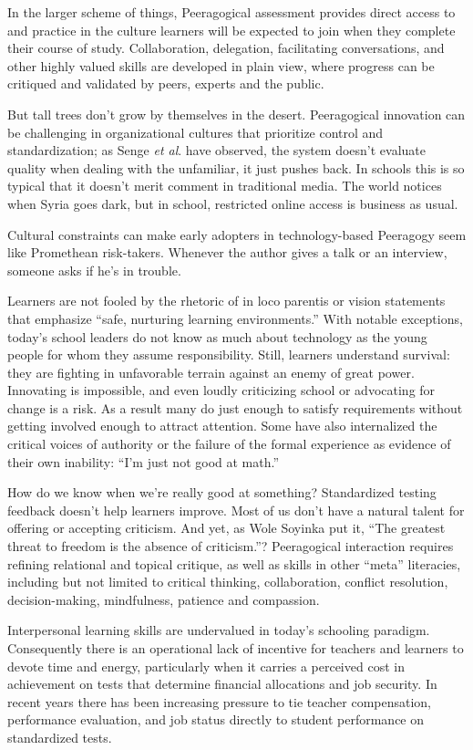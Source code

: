 In the larger scheme of things, Peeragogical assessment provides direct
access to and practice in the culture learners will be expected to join
when they complete their course of study. Collaboration, delegation,
facilitating conversations, and other highly valued skills are developed
in plain view, where progress can be critiqued and validated by peers,
experts and the public.

But tall trees don't grow by themselves in the desert. Peeragogical
innovation can be challenging in organizational cultures that prioritize
control and standardization; as Senge \emph{et al}. have observed, the
system doesn't evaluate quality when dealing with the unfamiliar, it
just pushes back. In schools this is so typical that it doesn't merit
comment in traditional media. The world notices when Syria goes dark,
but in school, restricted online access is business as usual.

Cultural constraints can make early adopters in technology-based
Peeragogy seem like Promethean risk-takers. Whenever the author gives a
talk or an interview, someone asks if he's in trouble.

Learners are not fooled by the rhetoric of in loco parentis or vision
statements that emphasize ``safe, nurturing learning environments.''
With notable exceptions, today's school leaders do not know as much
about technology as the young people for whom they assume
responsibility. Still, learners understand survival: they are fighting
in unfavorable terrain against an enemy of great power. Innovating is
impossible, and even loudly criticizing school or advocating for change
is a risk. As a result many do just enough to satisfy requirements
without getting involved enough to attract attention. Some have also
internalized the critical voices of authority or the failure of the
formal experience as evidence of their own inability: ``I'm just not
good at math.''

How do we know when we're really good at something? Standardized testing
feedback doesn't help learners improve. Most of us don't have a natural
talent for offering or accepting criticism. And yet, as Wole Soyinka put
it, ``The greatest threat to freedom is the absence of criticism.''?
Peeragogical interaction requires refining relational and topical
critique, as well as skills in other ``meta'' literacies, including but
not limited to critical thinking, collaboration, conflict resolution,
decision-making, mindfulness, patience and compassion.

Interpersonal learning skills are undervalued in today's schooling
paradigm. Consequently there is an operational lack of incentive for
teachers and learners to devote time and energy, particularly when it
carries a perceived cost in achievement on tests that determine
financial allocations and job security. In recent years there has been
increasing pressure to tie teacher compensation, performance evaluation,
and job status directly to student performance on standardized tests.

